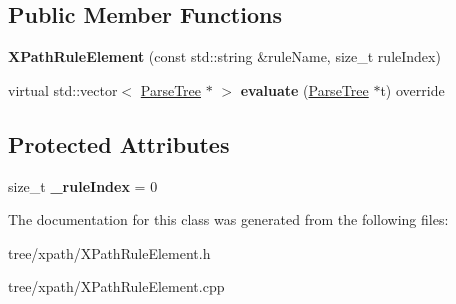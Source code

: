 \subsection*{Public Member Functions}
\begin{DoxyCompactItemize}
\item 
\mbox{\label{classantlr4_1_1tree_1_1xpath_1_1XPathRuleElement_a4194b7cf041632a9942ae8c0623fb1ca}} 
{\bfseries X\+Path\+Rule\+Element} (const std\+::string \&rule\+Name, size\+\_\+t rule\+Index)
\item 
\mbox{\label{classantlr4_1_1tree_1_1xpath_1_1XPathRuleElement_a5883fa4f08dc0e9a3a4a4cf49dfa8a80}} 
virtual std\+::vector$<$ \hyperlink{classantlr4_1_1tree_1_1ParseTree}{Parse\+Tree} $\ast$ $>$ {\bfseries evaluate} (\hyperlink{classantlr4_1_1tree_1_1ParseTree}{Parse\+Tree} $\ast$t) override
\end{DoxyCompactItemize}
\subsection*{Protected Attributes}
\begin{DoxyCompactItemize}
\item 
\mbox{\label{classantlr4_1_1tree_1_1xpath_1_1XPathRuleElement_a637c4964fbdb450a39a891eb281d05c9}} 
size\+\_\+t {\bfseries \+\_\+rule\+Index} = 0
\end{DoxyCompactItemize}


The documentation for this class was generated from the following files\+:\begin{DoxyCompactItemize}
\item 
tree/xpath/X\+Path\+Rule\+Element.\+h\item 
tree/xpath/X\+Path\+Rule\+Element.\+cpp\end{DoxyCompactItemize}
